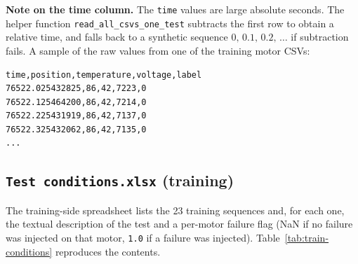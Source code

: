 \documentclass[11pt,a4paper]{article}
\begin{document}
\textbf{Note on the time column.} The \texttt{time} values are large absolute
seconds. The helper function \texttt{read\_all\_csvs\_one\_test} subtracts
the first row to obtain a relative time, and falls back to a synthetic
sequence $0,\,0.1,\,0.2,\,\dots$ if subtraction fails. A sample of the raw
values from one of the training motor CSVs:

\begin{verbatim}
time,position,temperature,voltage,label
76522.025432825,86,42,7223,0
76522.125464200,86,42,7214,0
76522.225431919,86,42,7137,0
76522.325432062,86,42,7135,0
...
\end{verbatim}

\subsection{\texttt{Test conditions.xlsx} (training)}

The training-side spreadsheet lists the 23 training sequences and, for each one,
the textual description of the test and a per-motor failure flag (NaN if no
failure was injected on that motor, \texttt{1.0} if a failure was injected).
Table~\ref{tab:train-conditions} reproduces the contents.
\end{document}
